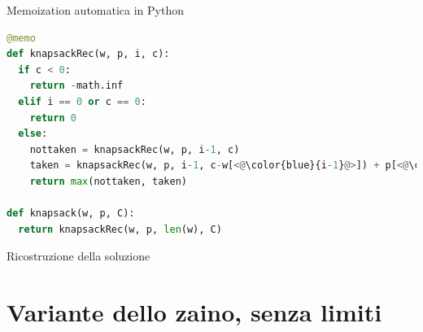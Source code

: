\begin{frame}[fragile]{Memoization automatica in Python}

\vspace{-9pt}
\begin{lstlisting}[language=python]
@memo
def knapsackRec(w, p, i, c):
  if c < 0:
    return -math.inf
  elif i == 0 or c == 0:
    return 0
  else:
    nottaken = knapsackRec(w, p, i-1, c)
    taken = knapsackRec(w, p, i-1, c-w[<@\color{blue}{i-1}@>]) + p[<@\color{blue}{i-1}@>]
    return max(nottaken, taken) 

def knapsack(w, p, C):
  return knapsackRec(w, p, len(w), C)

\end{lstlisting}



\end{frame}


\begin{frame}{Ricostruzione della soluzione}

\vspace{-9pt}

\end{frame}

\section{Variante dello zaino, senza limiti}



